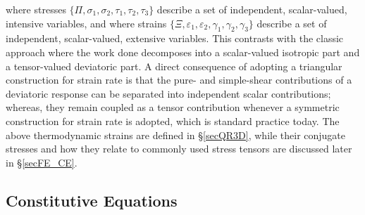 where stresses $\{ \Pi , \sigma_1 , \sigma_2 , \tau_1 , \tau_2 , \tau_3  \}$ describe a set of independent, scalar-valued, intensive variables, and where strains $\{ \Xi , \varepsilon_1 , \varepsilon_2 , \gamma_1 , \gamma_2 , \gamma_3 \}$ describe a set of independent, scalar-valued, extensive variables.  This contrasts with the classic approach where the work done decomposes into a scalar-valued isotropic part and a tensor-valued deviatoric part.  A direct consequence of adopting a triangular construction for strain rate is that the pure- and simple-shear contributions of a deviatoric response can be separated into independent scalar contributions; whereas, they remain coupled as a tensor contribution whenever a symmetric construction for strain rate is adopted, which is standard practice today.  The above thermo\-dynamic strains are defined in \S\ref{secQR3D}, while their conjugate stresses and how they relate to commonly used stress tensors are discussed later in \S\ref{secFE_CE}. 

\subsection{Constitutive Equations}


